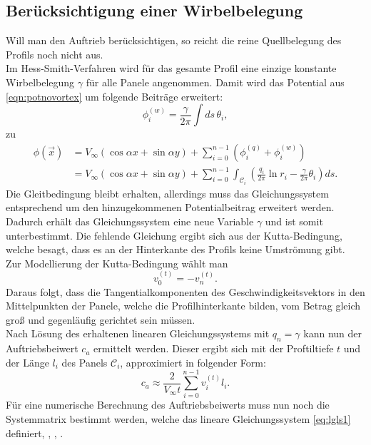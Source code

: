 \subsection{Berücksichtigung einer Wirbelbelegung}
Will man den Auftrieb berücksichtigen, so reicht die reine Quellbelegung des Profils noch nicht aus. \\
Im Hess-Smith-Verfahren wird für das gesamte Profil eine einzige konstante Wirbelbelegung $\gamma$ für alle Panele angenommen. Damit wird das Potential aus \eqref{eqn:potnovortex} um folgende Beiträge erweitert:
\begin{equation}
\phi_i^{(w)} =  \frac{\gamma}{2 \pi } \int ds \, \theta_i,
\end{equation}
zu
\begin{align}
\phi(\vec x) &=  V_{\infty} (\cos{\alpha} x + \sin{\alpha} y) + \sum_{i=0}^{n-1} \left( \phi_i^{(q)} + \phi_i^{(w)} \right) \nonumber \\
&= V_{\infty} (\cos{\alpha} x + \sin{\alpha} y) + \sum_{i=0}^{n-1} \int_{\mathcal{C}_i} \left( \frac{q_i}{2\pi } \ln r_i - \frac{\gamma}{2\pi } \theta_{i} \right) ds.
\end{align}
Die Gleitbedingung bleibt erhalten, allerdings muss das Gleichungssystem entsprechend um den hinzugekommenen Potentialbeitrag erweitert werden. Dadurch erhält das Gleichungssystem eine neue Variable $\gamma$ und ist somit unterbestimmt. Die fehlende Gleichung ergibt sich aus der Kutta-Bedingung, welche besagt, dass es an der Hinterkante des Profils keine Umströmung gibt.\\
Zur Modellierung der Kutta-Bedingung wählt man
\begin{equation}
v_0^{(t)} =  -v_n^{(t)}.
\end{equation} 
Daraus folgt, dass die Tangentialkomponenten des Geschwindigkeitsvektors in den Mittelpunkten der Panele, welche die Profilhinterkante bilden, vom Betrag gleich groß und gegenläufig gerichtet sein müssen. %
\\
Nach Lösung des erhaltenen linearen Gleichungssystems mit $q_n = \gamma$ kann nun der Auftriebsbeiwert $c_a$ ermittelt werden. Dieser ergibt sich mit der Proftiltiefe $t$ und der Länge $l_i$ des Panels $\mathcal{C}_i$, approximiert in folgender Form:
\begin{equation}
c_a \approx \frac{2}{V_{\infty}t}\sum_{i=0}^{n-1} v_i^{(t)} l_i.
\end{equation}
Für eine numerische Berechnung des Auftriebsbeiwerts muss nun noch die Systemmatrix bestimmt werden, welche das lineare Gleichungssystem \eqref{eq:lgls1} definiert,  \cite{Hess:1966}, \cite{Cebeci:1999}, \cite{Alonso:2005}.

